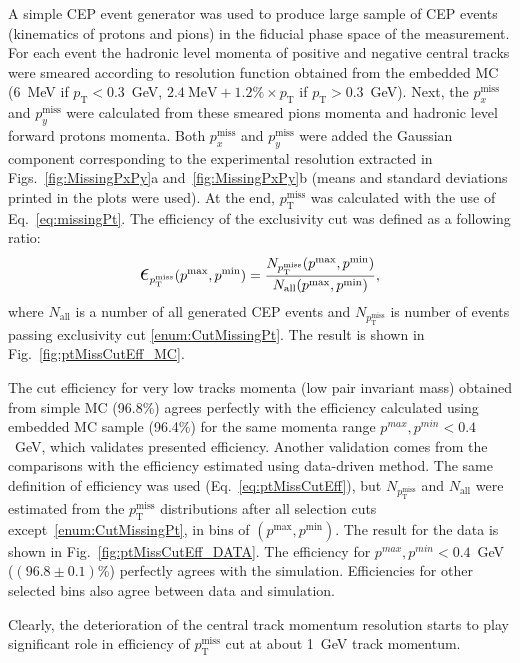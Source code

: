 A simple CEP event generator was used to produce large sample of CEP events (kinematics of protons and pions) in the fiducial phase space of the measurement. For each event the hadronic level momenta of positive and negative central tracks were smeared according to resolution function obtained from the embedded MC (6~MeV if $p_{\text{T}}<0.3$~GeV, $2.4~\text{MeV} + 1.2\%\times p_{\text{T}}$ if $p_{\text{T}}>0.3$~GeV). Next, the $p_{x}^{\text{miss}}$ and $p_{y}^{\text{miss}}$ were calculated from these smeared pions momenta and hadronic level forward protons momenta. Both $p_{x}^{\text{miss}}$ and $p_{y}^{\text{miss}}$ were added the Gaussian component corresponding to the experimental resolution extracted in Figs.~\ref{fig:MissingPxPy}a and~\ref{fig:MissingPxPy}b (means and standard deviations printed in the plots were used). At the end, $p_{\text{T}}^{\text{miss}}$ was calculated with the use of Eq.~\eqref{eq:missingPt}. The efficiency of the exclusivity cut was defined as a following ratio:
\begin{equation}\label{eq:ptMissCutEff}
 \mbox{\LARGE$\epsilon$}_{p_{\text{T}}^{\text{miss}}}(p^{\text{max}}, p^{\text{min}}) = \frac{N_{p_{\text{T}}^{\text{miss}}}(p^{\text{max}}, p^{\text{min}})}{N_{\text{all}}(p^{\text{max}}, p^{\text{min}})},
\end{equation}
where $N_{\text{all}}$ is a number of all generated CEP events and $N_{p_{\text{T}}^{\text{miss}}} $ is number of events passing exclusivity cut \ref{enum:CutMissingPt}. The result is shown in Fig.~\ref{fig:ptMissCutEff_MC}.

The cut efficiency for very low tracks momenta (low pair invariant mass) obtained from simple MC (96.8\%) agrees perfectly with the efficiency calculated using embedded MC sample (96.4\%) for the same momenta range $p^{max}, p^{min}<0.4$~GeV, which validates presented efficiency. Another validation comes from the comparisons with the efficiency estimated using data-driven method. The same definition of efficiency was used (Eq.~\eqref{eq:ptMissCutEff}), but $N_{p_{\text{T}}^{\text{miss}}}$ and $N_{\text{all}}$ were estimated from the $p_{\text{T}}^{\text{miss}}$ distributions after all selection cuts except~\ref{enum:CutMissingPt}, in bins of $(p^{\text{max}}, p^{\text{min}})$. The result for the data is shown in Fig.~\ref{fig:ptMissCutEff_DATA}. The efficiency for $p^{max}, p^{min}<0.4$~GeV ($(96.8\pm0.1)$\%) perfectly agrees with the simulation. Efficiencies for other selected bins also agree between data and simulation.

Clearly, the deterioration of the central track momentum resolution starts to play significant role in efficiency of $p_{\text{T}}^{\text{miss}}$ cut at about 1~GeV track momentum.


